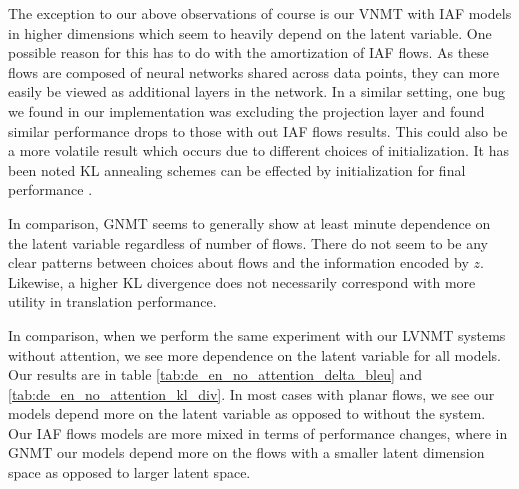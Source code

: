 The exception to our above observations of course is our \ac{VNMT} with \ac{IAF} models in higher dimensions which seem to heavily depend on the latent variable. One possible reason for this has to do with the amortization of \ac{IAF} flows. As these flows are composed of neural networks shared across data points, they can more easily be viewed as additional layers in the network. In a similar setting, one bug we found in our implementation was excluding the projection layer and found similar performance drops to those with out \ac{IAF} flows results. This could also be a more volatile result which occurs due to different choices of initialization. It has been noted KL annealing schemes can be effected by initialization for final performance \cite{sphericallatent2018Xu}.

In comparison, \ac{GNMT} seems to generally show at least minute dependence on the latent variable regardless of number of flows. There do not seem to be any clear patterns between choices about flows and the information encoded by $z$. Likewise, a higher KL divergence does not necessarily correspond with more utility in translation performance.  

In comparison, when we perform the same experiment with our \ac{LVNMT} systems without attention, we see more dependence on the latent variable for all models. Our results are in table \ref{tab:de_en_no_attention_delta_bleu} and \ref{tab:de_en_no_attention_kl_div}. In most cases with planar flows, we see our models depend more on the latent variable as opposed to without the system. Our \ac{IAF} flows models are more mixed in terms of performance changes, where in \ac{GNMT} our models depend more on the flows with a smaller latent dimension space as opposed to larger latent space. 

